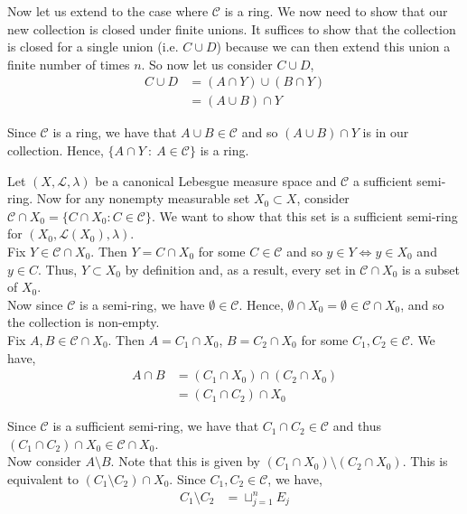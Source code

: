 \documentclass[12pt]{article}
\newenvironment{problem}[2][Problem]{\begin{trivlist}
\item[\hskip \labelsep {\bfseries #1}\hskip \labelsep {\bfseries #2.}]}{\end{trivlist}}
\begin{document}
Now let us extend to the case where $\mathcal{C}$ is a ring. We now need to show that our new collection is closed under finite unions. It suffices to show that the collection is closed for a single union (i.e. $C \cup D$) because we can then extend this union a finite number of times $n$. So now let us consider $C \cup D$,
\begin{align*}
C \cup D &= (A \cap Y) \cup (B \cap Y)\\
&= (A \cup B) \cap Y
\end{align*}

Since $\mathcal{C}$ is a ring, we have that $A \cup B \in \mathcal{C}$ and so $(A \cup B) \cap Y$ is in our collection. Hence, $\{A \cap Y \ : \ A \in \mathcal{C} \}$ is a ring.

\begin{problem}{2}
\end{problem}

Let $(X, \mathcal{L}, \lambda)$ be a canonical Lebesgue measure space and $\mathcal{C}$ a sufficient semi-ring. Now for any nonempty measurable set $X_0 \subset X$, consider $\mathcal{C} \cap X_0 = \{C \cap X_0 : C \in \mathcal{C}\}$. We want to show that this set is a sufficient semi-ring for $(X_0, \mathcal{L}(X_0), \lambda)$.\\

Fix $Y \in \mathcal{C} \cap X_0$. Then $Y = C \cap X_0$ for some $C \in \mathcal{C}$ and so $y \in Y \iff y \in X_0$ and $y \in C$. Thus, $Y \subset X_0$ by definition and, as a result, every set in $\mathcal{C} \cap X_0$ is a subset of $X_0$.\\

Now since $\mathcal{C}$ is a semi-ring, we have $\emptyset \in \mathcal{C}$. Hence, $\emptyset \cap X_0 = \emptyset \in \mathcal{C} \cap X_0$, and so the collection is non-empty.\\

Fix $A, B \in \mathcal{C} \cap X_0$. Then $A = C_1 \cap X_0$, $B = C_2 \cap X_0$ for some $C_1, C_2 \in \mathcal{C}$. We have,
\begin{align*}
A \cap B &= (C_1 \cap X_0) \cap (C_2 \cap X_0)\\
&= (C_1 \cap C_2) \cap X_0
\end{align*}

Since $\mathcal{C}$ is a sufficient semi-ring, we have that $C_1 \cap C_2 \in \mathcal{C}$ and thus $(C_1 \cap C_2) \cap X_0 \in \mathcal{C} \cap X_0$.\\

Now consider $A \setminus B$. Note that this is given by $(C_1 \cap X_0) \setminus (C_2 \cap X_0)$. This is equivalent to $(C_1 \setminus C_2) \cap X_0$. Since $C_1, C_2 \in \mathcal{C}$, we have,
\begin{align*}
C_1 \setminus C_2 &= \sqcup_{j=1}^n E_j
\end{align*}
\end{document}
